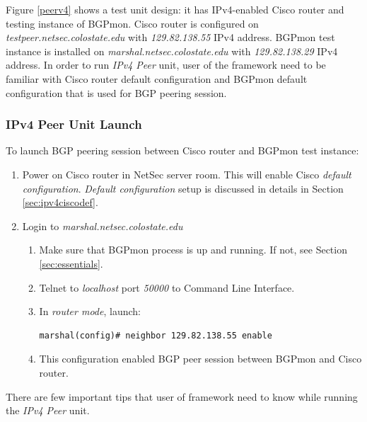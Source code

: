 Figure \ref{peerv4} shows a test unit design: it has IPv4-enabled Cisco router and testing instance of BGPmon.   Cisco router is configured on \emph{testpeer.netsec.colostate.edu} with \emph{129.82.138.55} IPv4 address.  BGPmon test instance is installed on \emph{marshal.netsec.colostate.edu} with \emph{129.82.138.29} IPv4 address.    In order to run \emph{IPv4 Peer} unit, user of the framework need to be familiar with Cisco router default configuration and BGPmon default configuration that is used for BGP peering session.

\subsubsection{IPv4 Peer Unit Launch}

To launch BGP peering session between Cisco router and BGPmon test instance:
\begin{enumerate}
\item{Power on Cisco router in NetSec server room. This will enable Cisco \emph{default configuration}. \emph{Default configuration} setup is discussed in details in  Section \ref{sec:ipv4ciscodef}.}
\item{Login to \emph{marshal.netsec.colostate.edu}}
  \begin{enumerate}
  \item{Make sure that BGPmon process is up and running. If not, see Section \ref{sec:essentials}.}
  \item{Telnet to \emph{localhost} port \emph{50000} to Command Line Interface.}
  \item{In \emph{router mode}, launch:}
    \begin{verbatim}
marshal(config)# neighbor 129.82.138.55 enable
    \end{verbatim}
   \item{This configuration enabled BGP peer session between BGPmon and Cisco router.} 
  \end{enumerate}
\end{enumerate}

There are few important tips that user of framework need to know while running the \emph{IPv4 Peer} unit. 

